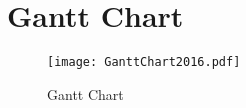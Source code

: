 \chapter{Gantt Chart} \label{App:Gantt}

\begin{figure}[H]
\centerline{\texttt{[image: GanttChart2016.pdf]}}
\caption[]{Gantt Chart}
\label{fig:Gantt}
\end{figure}
